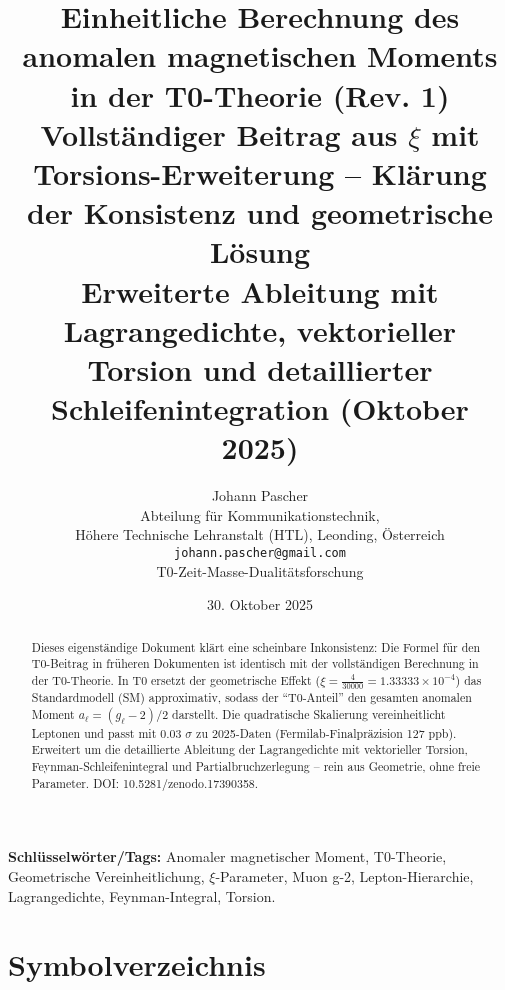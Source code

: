\documentclass[12pt,a4paper]{article}
\title{\textbf{Einheitliche Berechnung des anomalen magnetischen Moments in der T0-Theorie (Rev. 1)}\\[0.5cm]
	\large Vollständiger Beitrag aus $\xi$ mit Torsions-Erweiterung -- Klärung der Konsistenz und geometrische Lösung\\[0.3cm]
	\normalsize Erweiterte Ableitung mit Lagrangedichte, vektorieller Torsion und detaillierter Schleifenintegration (Oktober 2025)}
\author{Johann Pascher\\
	\small Abteilung für Kommunikationstechnik,\\
	\small Höhere Technische Lehranstalt (HTL), Leonding, Österreich\\
	\small \texttt{johann.pascher@gmail.com}\\
	\small T0-Zeit-Masse-Dualitätsforschung}
\date{30. Oktober 2025}
\begin{document}
	
	\maketitle
	\thispagestyle{fancy}
	
	\begin{abstract}
		Dieses eigenständige Dokument klärt eine scheinbare Inkonsistenz: Die Formel für den T0-Beitrag in früheren Dokumenten ist identisch mit der vollständigen Berechnung in der T0-Theorie. In T0 ersetzt der geometrische Effekt ($\xi = \frac{4}{30000} = 1.33333 \times 10^{-4}$) das Standardmodell (SM) approximativ, sodass der ``T0-Anteil'' den gesamten anomalen Moment $a_\ell = (g_\ell - 2)/2$ darstellt. Die quadratische Skalierung vereinheitlicht Leptonen und passt mit 0.03 $\sigma$ zu 2025-Daten (Fermilab-Finalpräzision 127 ppb). Erweitert um die detaillierte Ableitung der Lagrangedichte mit vektorieller Torsion, Feynman-Schleifenintegral und Partialbruchzerlegung -- rein aus Geometrie, ohne freie Parameter. DOI: 10.5281/zenodo.17390358.
	\end{abstract}
	
	\textbf{Schlüsselwörter/Tags:} Anomaler magnetischer Moment, T0-Theorie, Geometrische Vereinheitlichung, $\xi$-Parameter, Muon g-2, Lepton-Hierarchie, Lagrangedichte, Feynman-Integral, Torsion.
	
	\tableofcontents
	
	\section*{Symbolverzeichnis}
	
\end{document}
